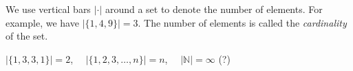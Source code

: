 \begin{Definition}[Cardinality]
We use vertical bars $|\cdot|$ around a set
to denote the number of elements.
For example, we have $|\{1,4,9\}|=3$. The number of elements is called the \emph{cardinality} of the set. 
\end{Definition}

\begin{example}
 $|\{1,3,3,1\}|=2$, $ \quad |\{1,2,3, \ldots, n \}| = n$,
  $ \quad | \mathbb{N} | = \infty$ (?)
\end{example}


